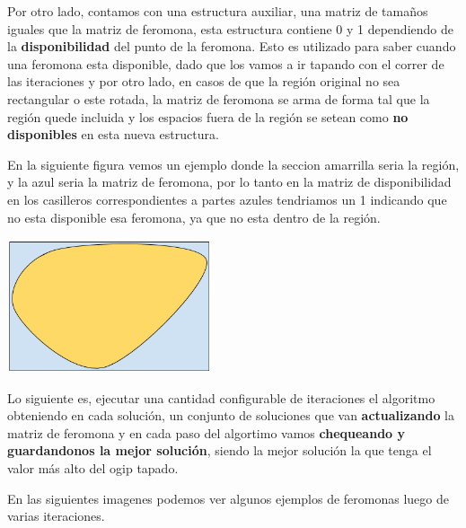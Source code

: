 Por otro lado, contamos con una estructura auxiliar, una matriz de tamaños iguales que la matriz de feromona, esta estructura contiene 0 y 1 dependiendo de la \textbf{disponibilidad} del punto de la feromona. Esto es utilizado para saber cuando una feromona esta disponible, dado que los vamos a ir tapando con el correr de las iteraciones y por otro lado, en casos de que la regi\'on original no sea rectangular o este rotada, la matriz de feromona se arma de forma tal que la regi\'on quede incluida y los espacios fuera de la regi\'on se setean como \textbf{no disponibles} en esta nueva estructura. 

En la siguiente figura vemos un ejemplo donde la seccion amarrilla seria la regi\'on, y la azul seria la matriz de feromona, por lo tanto en la matriz de disponibilidad en los casilleros correspondientes a partes azules tendriamos un 1 indicando que no esta disponible esa feromona, ya que no esta dentro de la regi\'on.

\begin{center}
\includegraphics[width=6cm]{imagenes/ejemplo1}
\end{center}


Lo siguiente es, ejecutar una cantidad configurable de iteraciones el algoritmo obteniendo en cada soluci\'on, un conjunto de soluciones que van \textbf{actualizando} la matriz de feromona y en cada paso del algortimo vamos \textbf{chequeando y guardandonos la mejor soluci\'on}, siendo la mejor soluci\'on la que tenga el valor m\'as alto del ogip tapado. 

\newpage

En las siguientes imagenes podemos ver algunos ejemplos de feromonas luego de varias iteraciones.

